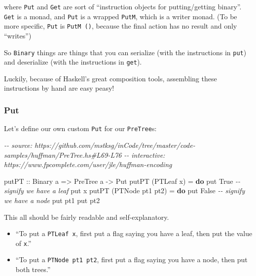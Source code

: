 \documentclass[]{article}
\newenvironment{Shaded}{}{}
\newcommand{\CommentTok}[1]{\textcolor[rgb]{0.38,0.63,0.69}{\textit{#1}}}
\newcommand{\DataTypeTok}[1]{\textcolor[rgb]{0.56,0.13,0.00}{#1}}
\newcommand{\KeywordTok}[1]{\textcolor[rgb]{0.00,0.44,0.13}{\textbf{#1}}}
\newcommand{\NormalTok}[1]{#1}
\newcommand{\OtherTok}[1]{\textcolor[rgb]{0.00,0.44,0.13}{#1}}
\begin{document}
where \texttt{Put} and \texttt{Get} are sort of ``instruction objects for
putting/getting binary''. \texttt{Get} is a monad, and \texttt{Put} is a wrapped
\texttt{PutM}, which is a writer monad. (To be more specific, \texttt{Put} is
\texttt{PutM\ ()}, because the final action has no result and only ``writes'')

So \texttt{Binary} things are things that you can serialize (with the
instructions in \texttt{put}) and deserialize (with the instructions in
\texttt{get}).

Luckily, because of Haskell's great composition tools, assembling these
instructions by hand are easy peasy!

\subsubsection{Put}\label{put}

Let's define our own custom \texttt{Put} for our \texttt{PreTree}s:

\begin{Shaded}
\begin{Highlighting}[]
\CommentTok{{-}{-} source: https://github.com/mstksg/inCode/tree/master/code{-}samples/huffman/PreTree.hs\#L69{-}L76}
\CommentTok{{-}{-} interactive: https://www.fpcomplete.com/user/jle/huffman{-}encoding}

\OtherTok{putPT ::} \DataTypeTok{Binary}\NormalTok{ a }\OtherTok{=\textgreater{}} \DataTypeTok{PreTree}\NormalTok{ a }\OtherTok{{-}\textgreater{}} \DataTypeTok{Put}
\NormalTok{putPT (}\DataTypeTok{PTLeaf}\NormalTok{ x) }\OtherTok{=} \KeywordTok{do}
\NormalTok{    put }\DataTypeTok{True}                    \CommentTok{{-}{-} signify we have a leaf}
\NormalTok{    put x}
\NormalTok{putPT (}\DataTypeTok{PTNode}\NormalTok{ pt1 pt2) }\OtherTok{=} \KeywordTok{do}
\NormalTok{    put }\DataTypeTok{False}                   \CommentTok{{-}{-} signify we have a node}
\NormalTok{    put pt1}
\NormalTok{    put pt2}
\end{Highlighting}
\end{Shaded}

This all should be fairly readable and self-explanatory.

\begin{itemize}
\item
  ``To put a \texttt{PTLeaf\ x}, first put a flag saying you have a leaf, then
  put the value of \texttt{x}.''
\item
  ``To put a \texttt{PTNode\ pt1\ pt2}, first put a flag saying you have a node,
  then put both trees.''
\end{itemize}
\end{document}

